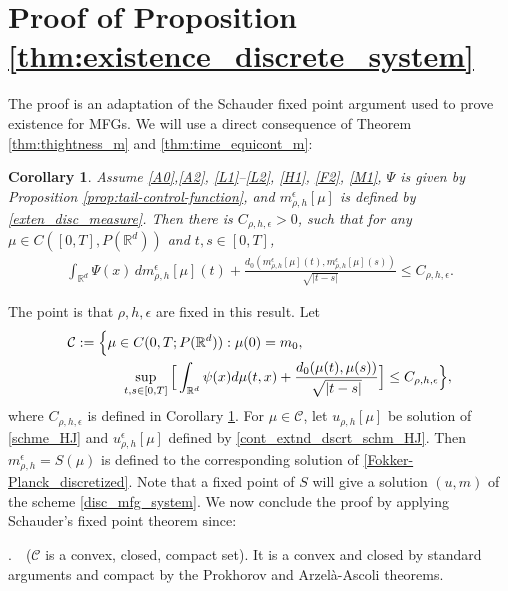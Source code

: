 \documentclass[a4paper,  twoside, 10pt, leqno]{amsart}
\newcommand{\R}{\mathbb{R}}
\newcommand{\rd}{\mathbb{R}^d}
\newtheorem{corollary}[thm]{Corollary}
\theoremstyle{remark}
\theoremstyle{definition}
\begin{document}
\appendix

\section{Proof of Proposition \ref{thm:existence_discrete_system}}\label{app:pf_ex}
   The proof is an adaptation of the Schauder fixed point argument used to prove existence for MFGs. We will use a direct consequence of Theorem \ref{thm:thightness_m} and \ref{thm:time_equicont_m}:
\begin{corollary}
\label{cor:thightness_m_rho-h}
    Assume \ref{A0},\ref{A2}, \ref{L1}--\ref{L2}, \ref{H1}, \ref{F2}, \ref{M1}, $\Psi$ is given by Proposition \ref{prop:tail-control-function}, and $m^{\epsilon}_{\rho,h}[\mu]$ is defined by \eqref{exten_disc_measure}. Then there is $C_{\rho,h,\epsilon}>0$, such that for any  $\mu \in  C ( [0,T], P ( \rd ))$ and $t,s\in[0,T]$,
\begin{align*}
\int_{\R^d} \Psi(x) \, dm^{\epsilon}_{\rho,h}[\mu](t) +\frac{d_0(m^\epsilon_{\rho,h}[\mu](t),m^\epsilon_{\rho,h}[\mu](s))}{\sqrt{|t-s|}}\leq C_{\rho,h,\epsilon}.
\end{align*}
\end{corollary}
\smallskip
The point is that $\rho,h,\epsilon$ are fixed in this result. Let 
 \begin{align*}%
    \mathcal{C} := \Big\{ &\mu \in  C (  0,T  ; P ( \R^d  ) ) : \mu ( 0 ) = m_{0}, \\ 
        & \quad \sup_{t,s \in [  0,T] }\Big[ \int_{\R^d} \psi ( x ) d \mu ( t,x ) +
        \frac{d_{0} ( \mu ( t ), \mu ( s ) )}{\sqrt{ | t-s | }} \Big]\leq C_{\rho,h, \epsilon} 
    \Big\}, \notag
\end{align*}
where $C_{\rho,h, \epsilon}$ is defined in Corollary \ref{cor:thightness_m_rho-h}.  
For $\mu \in \mathcal{C}$, let $u_{\rho,h} [ \mu ]$ be solution of \eqref{schme_HJ} and $u_{\rho,h}^{\epsilon} [ \mu ]$ defined by
\eqref{cont_extnd_dscrt_schm_HJ}. Then $m_{\rho,h}^{\epsilon}  = S  ( \mu )$ is defined to the corresponding 
solution of \eqref{Fokker-Planck_discretized}.
Note that a fixed point of $S$ will give a solution $(u,m)$ of the scheme \eqref{disc_mfg_system}. We now conclude the proof by applying Schauder's fixed point theorem since:
\medskip 

 .~~($\mathcal C$ is a convex, closed, compact set). It is a convex and closed by standard arguments and compact by the
Prokhorov and Arzel\`a-Ascoli theorems.
\medskip 
\end{document}
